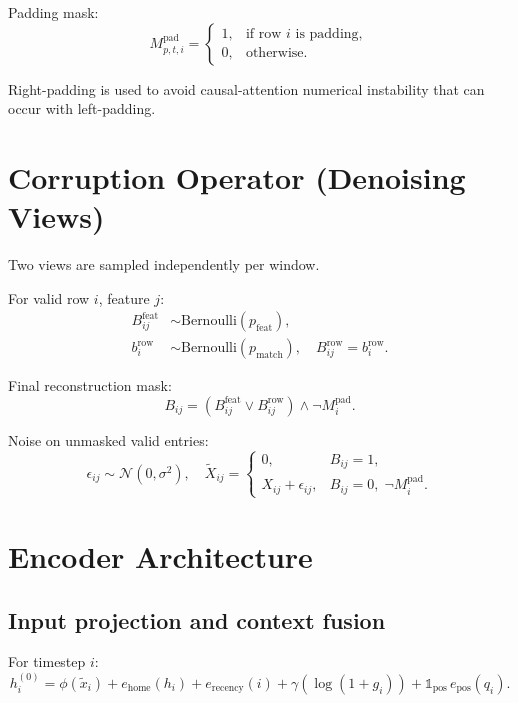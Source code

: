 \documentclass[11pt]{article}
\begin{document}
Padding mask:
\begin{equation}
M^{\text{pad}}_{p,t,i}=
\begin{cases}
1,&\text{if row }i\text{ is padding},\\
0,&\text{otherwise}.
\end{cases}
\end{equation}

Right-padding is used to avoid causal-attention numerical instability that can occur with left-padding.

\section{Corruption Operator (Denoising Views)}

Two views are sampled independently per window.

For valid row $i$, feature $j$:
\begin{align}
 B^{\text{feat}}_{ij} &\sim \text{Bernoulli}(p_{\text{feat}}),\\
 b^{\text{row}}_i &\sim \text{Bernoulli}(p_{\text{match}}),\quad B^{\text{row}}_{ij}=b^{\text{row}}_i.
\end{align}

Final reconstruction mask:
\begin{equation}
 B_{ij}=\left(B^{\text{feat}}_{ij}\lor B^{\text{row}}_{ij}\right)\land \neg M^{\text{pad}}_i.
\end{equation}

Noise on unmasked valid entries:
\begin{equation}
 \epsilon_{ij}\sim\mathcal{N}(0,\sigma^2),\quad
 \tilde X_{ij}=
 \begin{cases}
 0,&B_{ij}=1,\\
 X_{ij}+\epsilon_{ij},&B_{ij}=0,\;\neg M^{\text{pad}}_i.
 \end{cases}
\end{equation}

\section{Encoder Architecture}

\subsection{Input projection and context fusion}
For timestep $i$:
\begin{equation}
 h_i^{(0)} = \phi(\tilde x_i)
 + e_{\text{home}}(h_i)
 + e_{\text{recency}}(i)
 + \gamma\!\left(\log(1+g_i)\right)
 + \mathbb{1}_{\text{pos}}\,e_{\text{pos}}(q_i).
\end{equation}
\end{document}
